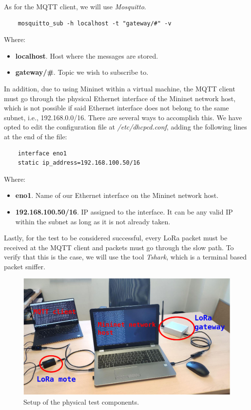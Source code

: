 As for the MQTT client, we will use \textit{Mosquitto}.
\begin{lstlisting}
    mosquitto_sub -h localhost -t "gateway/#" -v 
\end{lstlisting}

Where:
\begin{itemize}
    \item \textbf{localhost}. Host where the messages are stored.
    \item \textbf{gateway/\#}. Topic we wish to subscribe to.
\end{itemize}

In addition, due to using Mininet within a virtual machine, the MQTT client must go through the physical Ethernet interface of the Mininet network host, which is not possible if said Ethernet interface does not belong to the same subnet, i.e., 192.168.0.0/16. There are several ways to accomplish this. We have opted to edit the configuration file at \textit{/etc/dhcpcd.conf}, adding the following lines at the end of the file:
\begin{lstlisting}
    interface eno1
    static ip_address=192.168.100.50/16
\end{lstlisting}

Where:
\begin{itemize}
    \item \textbf{eno1}. Name of our Ethernet interface on the Mininet network host.
    \item \textbf{192.168.100.50/16}. IP assigned to the interface. It can be any valid IP within the subnet as long as it is not already taken.
\end{itemize}

Lastly, for the test to be considered successful, every LoRa packet must be received at the MQTT client and packets must go through the slow path. To verify that this is the case, we will use the tool \textit{Tshark}, which is a terminal based packet sniffer.

\begin{figure}
  \centering
  \includegraphics[width=\linewidth]{imagenes/Testing/lora_setup.png}
  \caption{Setup of the physical test components.}
  \label{fig:LoRa_setup}
\end{figure}


